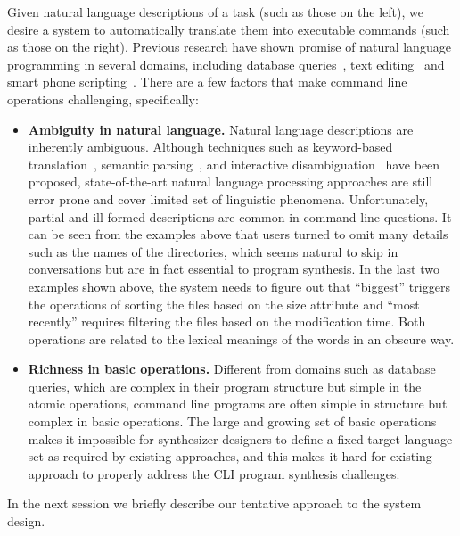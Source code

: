 Given natural language descriptions of a task (such as those on the left), we desire a system to automatically translate them into executable commands (such as those on the right). 
Previous research have shown promise of natural language programming in several domains, including database queries~\cite{DBLP:journals/pvldb/LiJ14, DBLP:conf/sigmod/GulwaniM14}, text editing~\cite{DBLP:journals/corr/DesaiGHJKMRR15} and smart phone scripting~\cite{DBLP:conf/mobisys/LeGS13}. 
There are a few factors that make command line operations challenging, specifically:
\begin{itemize}
\item \textbf{Ambiguity in natural language.} Natural language descriptions are inherently ambiguous. Although techniques such as keyword-based translation~\cite{DBLP:conf/sigmod/GulwaniM14}, semantic parsing~\citep{Zettlemoyer05learningto}, and interactive disambiguation~\cite{DBLP:journals/pvldb/LiJ14} have been proposed, state-of-the-art natural language processing approaches are still error prone and cover limited set of linguistic phenomena.
Unfortunately, partial and ill-formed descriptions are common in command line questions. It can be seen from the examples above that users turned to omit many details such as the names of the directories, which seems natural to skip in conversations but are in fact essential to program synthesis. In the last two examples shown above, the system needs to figure out that ``biggest'' triggers the operations of sorting the files based on the size attribute and ``most recently'' requires filtering the files based on the modification time. Both operations are related to the lexical meanings of the words in an obscure way.

\item \textbf{Richness in basic operations.} Different from domains such as database queries, which are complex in their program structure but simple in the atomic operations, command line programs are often simple in structure but complex in basic operations. The large and growing set of basic operations makes it impossible for synthesizer designers to define a fixed target language set as required by existing approaches, and this makes it hard for existing approach to properly address the CLI program synthesis challenges.
\end{itemize}

In the next session we briefly describe our tentative approach to the system design.